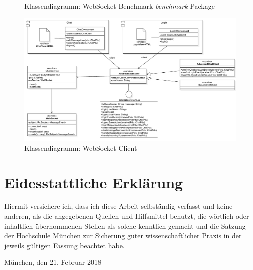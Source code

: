 \documentclass[11pt,a4paper,titlepage]{scrartcl}
\numberwithin{equation}{section}
\begin{document}
\begin{landscape}
\begin{figure}[ht]
\begin{center}
		\caption[]{Klassendiagramm: WebSocket-Benchmark \textit{benchmark}-Package}
		\label{fig:kdbench}
	\end{center}
\end{figure}
\begin{figure}[ht] 
	\begin{center}
		\includegraphics[scale=0.7]{img/ClientNew.pdf}
		\caption[]{Klassendiagramm: WebSocket-Client}
		\label{fig:kdClient}
	\end{center}
\end{figure}
\end{landscape}

\section*{Eidesstattliche Erklärung}
Hiermit versichere ich, dass ich diese Arbeit selbständig verfasst und keine anderen, als die angegebenen Quellen und Hilfsmittel benutzt, die wörtlich oder inhaltlich übernommenen Stellen als solche kenntlich gemacht und die Satzung der Hochschule München zur Sicherung guter wissenschaftlicher Praxis in der jeweils gültigen Fassung beachtet habe.\\
\vspace*{3cm}

\noindent München, den 21. Februar 2018
\end{document}
